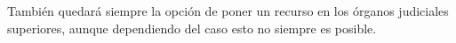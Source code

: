 \begin{enumerate}
\begin{enumerate}
        También quedará siempre la opción de poner un recurso en los órganos judiciales superiores, aunque dependiendo del caso esto no siempre es posible.
    \end{enumerate}
\end{enumerate}


\newpage



